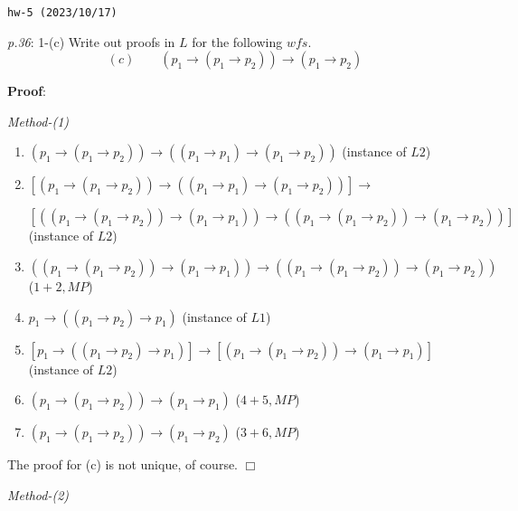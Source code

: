 \documentclass[UTF8,12pt,a4paper]{ctexart}
\begin{document}
\noindent\texttt{hw-5 (2023/10/17)}

\emph{p.36}: 1-(c) \quad
Write out proofs in $L$ for the following $wfs$.
\[
(c) \qquad  (p_1 \to (p_1 \to p_2)) \to (p_1 \to p_2)
\] 


\noindent\textbf{Proof}: 

\noindent\textit{Method-(1)}

\begin{enumerate}
	\item $ (p_1 \to (p_1 \to p_2)) \to ((p_1 \to p_1) \to (p_1 \to p_2)) $
	\hfill (instance of $L2$)
	
	\item $ [(p_1 \to (p_1 \to p_2)) \to ((p_1 \to p_1) \to (p_1 \to p_2))] \to  $
	
	$
	[( (p_1 \to (p_1 \to p_2)) \to (p_1 \to p_1))  \to
	( (p_1 \to (p_1 \to p_2)) \to (p_1 \to p_2)) ]
	$
	\hfill (instance of $L2$)
	
	\item $ ( (p_1 \to (p_1 \to p_2)) \to (p_1 \to p_1))  \to
	( (p_1 \to (p_1 \to p_2)) \to (p_1 \to p_2))$
	\hfill ($1+2,MP$)
	
	\item $p_1 \to ((p_1 \to p_2) \to p_1)$ 
	\hfill (instance of $L1$)
	
	\item $[p_1 \to ((p_1 \to p_2) \to p_1)] \to 
	[ (p_1 \to (p_1 \to p_2))  \to (p_1 \to p_1) ]$ 
	\hfill (instance of $L2$)
	
	\item $(p_1 \to (p_1 \to p_2))  \to (p_1 \to p_1)$
	\hfill ($4+5, MP$)
	
	\item $(p_1 \to (p_1 \to p_2)) \to (p_1 \to p_2)$ 
	\hfill ($3+6, MP$)
\end{enumerate}
The proof for (c) is not unique, of course.
\hfill $\Box$


\vspace{1em} 

\noindent\textit{Method-(2)}
\end{document}

